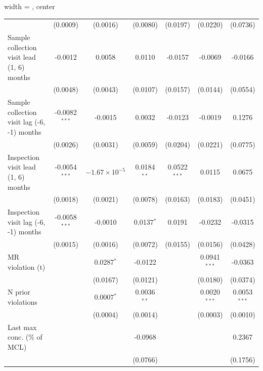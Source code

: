 \begin{table}[htbp]
\begin{adjustbox}{width = \textwidth, center}
\begin{tabular}{lcccccc}
                                                     & (0.0009)        & (0.0016)               & (0.0080)      & (0.0197)       & (0.0220)       & (0.0736)\\   
         Sample collection visit lead (1, 6) months  & -0.0012         & 0.0058                 & 0.0110        & -0.0157        & -0.0069        & -0.0166\\   
                                                     & (0.0048)        & (0.0043)               & (0.0107)      & (0.0157)       & (0.0144)       & (0.0554)\\   
         Sample collection visit lag (-6, -1) months & -0.0082$^{***}$ & -0.0015                & 0.0032        & -0.0123        & -0.0019        & 0.1276\\   
                                                     & (0.0026)        & (0.0031)               & (0.0059)      & (0.0204)       & (0.0221)       & (0.0775)\\   
         Inspection visit lead (1, 6) months         & -0.0054$^{***}$ & $-1.67\times 10^{-5}$  & 0.0184$^{**}$ & 0.0522$^{***}$ & 0.0115         & 0.0675\\   
                                                     & (0.0018)        & (0.0021)               & (0.0078)      & (0.0163)       & (0.0183)       & (0.0451)\\   
         Inspection visit lag (-6, -1) months        & -0.0058$^{***}$ & -0.0010                & 0.0137$^{*}$  & 0.0191         & -0.0232        & -0.0315\\   
                                                     & (0.0015)        & (0.0016)               & (0.0072)      & (0.0155)       & (0.0156)       & (0.0428)\\   
         MR violation (t)                            &                 & 0.0287$^{*}$           & -0.0122       &                & 0.0941$^{***}$ & -0.0363\\   
                                                     &                 & (0.0167)               & (0.0121)      &                & (0.0180)       & (0.0374)\\   
         N prior violations                          &                 & 0.0007$^{*}$           & 0.0036$^{**}$ &                & 0.0020$^{***}$ & 0.0053$^{***}$\\   
                                                     &                 & (0.0004)               & (0.0014)      &                & (0.0003)       & (0.0010)\\   
         Last max conc. (\% of MCL)                  &                 &                        & -0.0968       &                &                & 0.2367\\   
                                                     &                 &                        & (0.0766)      &                &                & (0.1756)\\   
         

\end{tabular}
\end{adjustbox}
\end{table}
